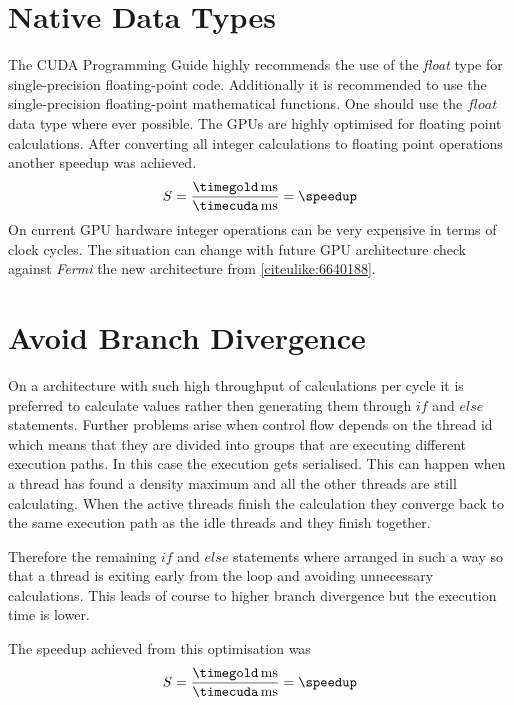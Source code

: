 \section{Native Data Types}
The \gls{CUDA} Programming Guide \citep{citeulike:3325943} highly recommends the
use of the \emph{float} type for single-precision floating-point code.
Additionally it is recommended to use the single-precision floating-point
mathematical functions. One should use the $float$ data type where ever
possible. The \glspl{GPU} are highly optimised for floating point calculations.
After converting all integer calculations to floating point operations another
speedup was achieved.
\fpDiv{\speedup}{\timegold}{\timecuda}
\begin{equation*}\label{eq:speedup5}
	S = \frac{\unit[\timegold]{ms}}{\unit[\timecuda]{ms}} = \speedup
\end{equation*}
On current \gls{GPU} hardware integer operations can be very expensive in terms
of clock cycles. The situation can change with future \gls{GPU} architecture check
against \emph{Fermi} the new architecture from {} 
\autoref{citeulike:6640188}.



\section{Avoid Branch Divergence} %
\label{sec:avoid_branch_divergence}
On a architecture with such high throughput of calculations per cycle it is
preferred to calculate values rather then generating them through $if$ and
$else$ statements. Further problems arise when control flow depends on the
thread id which means that they are divided into groups that are executing
different execution paths. In this case the execution gets serialised. This can
happen when a thread has found a density maximum and all the other threads are
still calculating. When the active threads finish the calculation they converge
back to the same execution path as the idle threads and they finish together.

Therefore the remaining $if$ and $else$ statements where arranged in such a way
so that a thread is exiting early from the loop and avoiding unnecessary
calculations. This leads of course to higher branch divergence but the execution
time is lower. 

The speedup achieved from this optimisation was
\fpDiv{\speedup}{\timegold}{\timecuda}
\begin{equation*}\label{eq:speedup6}
	S = \frac{\unit[\timegold]{ms}}{\unit[\timecuda]{ms}} = \speedup
\end{equation*}



